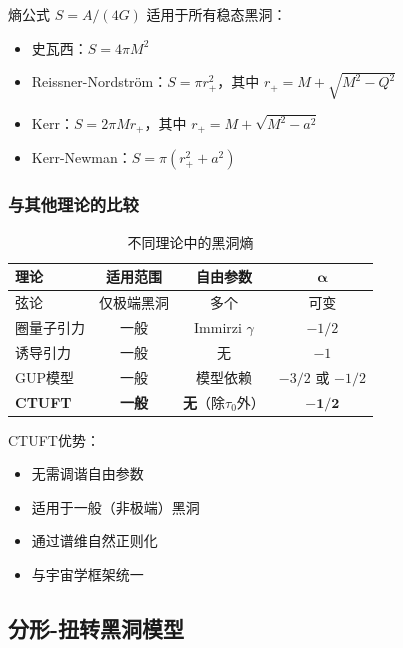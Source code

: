 \begin{theorem}[普适面积律]
熵公式 $S = A/(4G)$ 适用于所有稳态黑洞：
\begin{itemize}
    \item 史瓦西：$S = 4\pi M^2$
    \item Reissner-Nordström：$S = \pi r_+^2$，其中 $r_+ = M + \sqrt{M^2 - Q^2}$
    \item Kerr：$S = 2\pi M r_+$，其中 $r_+ = M + \sqrt{M^2 - a^2}$
    \item Kerr-Newman：$S = \pi(r_+^2 + a^2)$
\end{itemize}
\end{theorem}

\subsubsection{与其他理论的比较}

\begin{table}[h]
\centering
\caption{不同理论中的黑洞熵}
\begin{tabular}{lccc}
\toprule
\textbf{理论} & \textbf{适用范围} & \textbf{自由参数} & $\mathbf{\alpha}$ \\
\midrule
弦论 & 仅极端黑洞 & 多个 & 可变 \\
圈量子引力 & 一般 & Immirzi $\gamma$ & $-1/2$ \\
诱导引力 & 一般 & 无 & $-1$ \\
GUP模型 & 一般 & 模型依赖 & $-3/2$ 或 $-1/2$ \\
\textbf{CTUFT} & \textbf{一般} & \textbf{无}（除$\tau_0$外） & $\mathbf{-1/2}$ \\
\bottomrule
\end{tabular}
\end{table}

CTUFT优势：
\begin{itemize}
    \item 无需调谐自由参数
    \item 适用于一般（非极端）黑洞
    \item 通过谱维自然正则化
    \item 与宇宙学框架统一
\end{itemize}

\subsection{分形-扭转黑洞模型}

